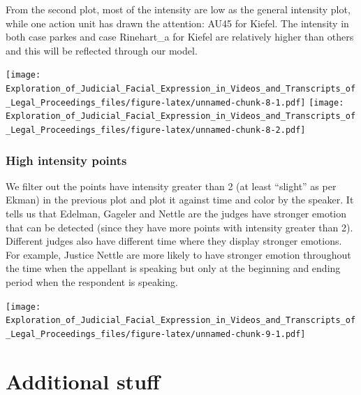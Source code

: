 \documentclass{monashthesis}
\begin{document}
From the second plot, most of the intensity are low as the general intensity plot, while one action unit has drawn the attention: AU45 for Kiefel. The intensity in both case parkes and case Rinehart\_a for Kiefel are relatively higher than others and this will be reflected through our model.

\texttt{[image: Exploration\_of\_Judicial\_Facial\_Expression\_in\_Videos\_and\_Transcripts\_of\_Legal\_Proceedings\_files/figure-latex/unnamed-chunk-8-1.pdf]} \texttt{[image: Exploration\_of\_Judicial\_Facial\_Expression\_in\_Videos\_and\_Transcripts\_of\_Legal\_Proceedings\_files/figure-latex/unnamed-chunk-8-2.pdf]}

\hypertarget{high-intensity-points}{%
\subsection{High intensity points}\label{high-intensity-points}}

We filter out the points have intensity greater than 2 (at least ``slight'' as per Ekman) in the previous plot and plot it against time and color by the speaker. It tells us that Edelman, Gageler and Nettle are the judges have stronger emotion that can be detected (since they have more points with intensity greater than 2). Different judges also have different time where they display stronger emotions. For example, Justice Nettle are more likely to have stronger emotion throughout the time when the appellant is speaking but only at the beginning and ending period when the respondent is speaking.

\texttt{[image: Exploration\_of\_Judicial\_Facial\_Expression\_in\_Videos\_and\_Transcripts\_of\_Legal\_Proceedings\_files/figure-latex/unnamed-chunk-9-1.pdf]}

\appendix

\hypertarget{additional-stuff}{%
\chapter{Additional stuff}\label{additional-stuff}}
\end{document}
